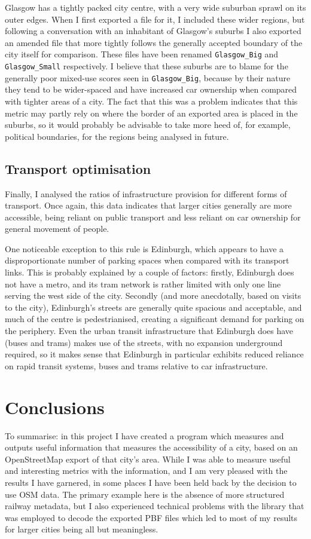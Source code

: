 \documentclass[12pt]{article} %
\begin{document}
Glasgow has a tightly packed city centre, with a very wide suburban sprawl on its outer edges. When I first exported a file for it, I included these wider regions, but following a conversation with an inhabitant of Glasgow's suburbs I also exported an amended file that more tightly follows the generally accepted boundary of the city itself for comparison. These files have been renamed \texttt{Glasgow\_Big} and \texttt{Glasgow\_Small} respectively. I believe that these suburbs are to blame for the generally poor mixed-use scores seen in \texttt{Glasgow\_Big}, because by their nature they tend to be wider-spaced and have increased car ownership when compared with tighter areas of a city. The fact that this was a problem indicates that this metric may partly rely on where the border of an exported area is placed in the suburbs, so it would probably be advisable to take more heed of, for example, political boundaries, for the regions being analysed in future.

\subsection{Transport optimisation}
Finally, I analysed the ratios of infrastructure provision for different forms of transport. Once again, this data indicates that larger cities generally are more accessible, being reliant on public transport and less reliant on car ownership for general movement of people.

One noticeable exception to this rule is Edinburgh, which appears to have a disproportionate number of parking spaces when compared with its transport links. This is probably explained by a couple of factors: firstly, Edinburgh does not have a metro, and its tram network is rather limited with only one line serving the west side of the city. Secondly (and more anecdotally, based on visits to the city), Edinburgh's streets are generally quite spacious and acceptable, and much of the centre is pedestrianised, creating a significant demand for parking on the periphery. Even the urban transit infrastructure that Edinburgh does have (buses and trams) makes use of the streets, with no expansion underground required, so it makes sense that Edinburgh in particular exhibits reduced reliance on rapid transit systems, buses and trams relative to car infrastructure.


\section{Conclusions}
To summarise: in this project I have created a program which measures and outputs useful information that measures the accessibility of a city, based on an OpenStreetMap export of that city's area. While I was able to measure useful and interesting metrics with the information, and I am very pleased with the results I have garnered, in some places I have been held back by the decision to use OSM data. The primary example here is the absence of more structured railway metadata, but I also experienced technical problems with the library that was employed to decode the exported PBF files which led to most of my results for larger cities being all but meaningless.
\end{document}
